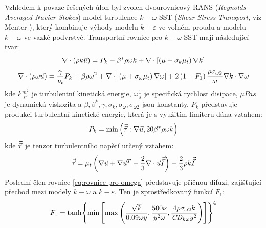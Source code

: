         Vzhledem k povaze řešených úloh byl zvolen dvourovnicový RANS (\textit{Reynolds Averaged Navier Stokes}) model turbulence $k-\omega$ SST (\textit{Shear Stress Transport}, viz \linebreak Menter \cite{Menter1993,Menter1994}), který kombinuje výhody modelu $k-\varepsilon$ ve volném proudu a modelu $k-\omega$ ve vazké podvrstvě. Transportní rovnice pro $k-\omega$ SST mají následující tvar:
        \begin{equation} \label{eq:rovnice-pro-k} 
            \nabla \cdot \left( \rho k \Vec{u} \right) = P_k - \beta ^* \rho \omega k + \nabla \cdot \left[ \left( \mu + \sigma _k \mu _t \right) \nabla k \right]
        \end{equation}
        \begin{equation} \label{eq:rovnice-pro-omega}
            \nabla \cdot \left( \rho \omega \Vec{u} \right) = \frac{\gamma}{\nu _t} P_k - \beta \rho \omega ^2 + \nabla \cdot \left[ \left( \mu + \sigma _\omega \mu _t \right) \nabla \omega \right] + 2 \left( 1 - F_1 \right) \frac{\rho \sigma _{\omega 2}}{\omega} \nabla k \cdot \nabla \omega
        \end{equation}
        \noindent kde $k \unit{\frac{m^2}{s^2}}$ je turbulentní kinetická energie, $\omega \unit{\frac{1}{s}}$ je specifická rychlost disipace, $\mu \unit{Pa s}$ je dynamická viskozita a $\beta, \beta^*, \gamma, \sigma _k, \sigma _\omega, \sigma _{\omega 2}$ jsou konstanty. $P_k$ představuje produkci turbulentní kinetické energie, která je s využitím limiteru dána vztahem:
        \begin{equation}
            P_k = \min \left( \Vec{\Vec{\tau}} : \nabla \Vec{u}, 20 \beta ^* \rho \omega k \right)
        \end{equation}
        kde $\Vec{\Vec{\tau}}$ je tenzor turbulentního napětí určený vztahem:
        \begin{equation}
            \Vec{\Vec{\tau}} = \mu _t \left( \nabla \Vec{u} + \nabla \Vec{u} ^T - \frac{2}{3} \nabla \cdot \Vec{u} \Vec{\Vec{I}} \right) - \frac{2}{3} \rho k \Vec{\Vec{I}}
        \end{equation}
        Poslední člen rovnice \ref{eq:rovnice-pro-omega} představuje příčnou difuzi, zajišťující přechod mezi modely $k-\omega$ a $k-\varepsilon$. Ten je zprostředkovaný funkcí $F_1$:
        \begin{equation}
            F_1 = \tanh \Biggl\{ \min \left[  \max \left( \frac{\sqrt{k}}{0.09 \omega y}, \frac{500 \nu}{y^2 \omega}, \frac{4 \rho \sigma _{\omega 2} k}{\mathord{\mathit{CD}}_{k \omega} y^2} \right) \right] \Biggr\} ^4  
        \end{equation}
